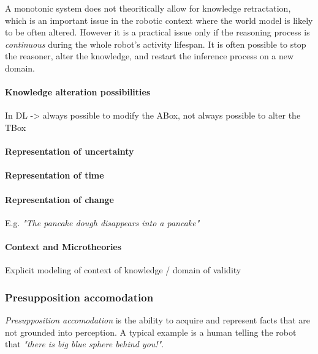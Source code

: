 \documentclass[a4paper, twocolumn]{article}
\begin{document}

A monotonic system does not theoritically allow for knowledge retractation,
which is an important issue in the robotic context where the world model is
likely to be often altered.  However it is a practical issue only if the
reasoning process is \emph{continuous} during the whole robot's activity
lifespan. It is often possible to stop the reasoner, alter the knowledge, and
restart the inference process on a new domain.

\paragraph{Knowledge alteration possibilities}

In DL -> always possible to modify the ABox, not always possible to alter the TBox

\paragraph{Representation of uncertainty}

\paragraph{Representation of time}

\paragraph{Representation of change}

E.g. \emph{"The pancake dough disappears into a pancake"}
 
\paragraph{Context and Microtheories}
Explicit modeling of context of knowledge / domain of validity

\subsubsection{Presupposition accomodation}
\label{sect|presupposition-accomodation}

\emph{Presupposition accomodation} is the ability to acquire and represent facts that are not
grounded into perception. A typical example is a human telling the robot that
\emph{"there is big blue sphere behind you!"}.
\end{document}
